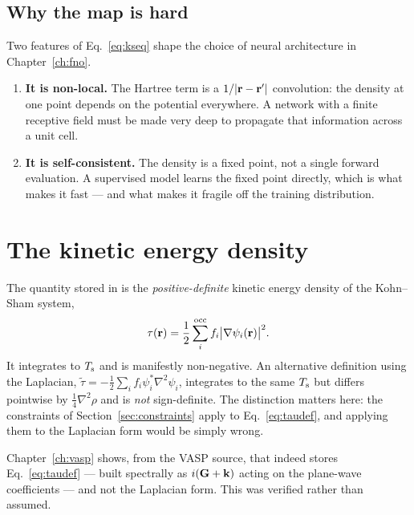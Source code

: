 \subsection{Why the map is hard}

Two features of Eq.~\eqref{eq:kseq} shape the choice of neural architecture in
Chapter~\ref{ch:fno}.

\begin{enumerate}
  \item \textbf{It is non-local.} The Hartree term is a
    $1/|\mathbf{r}-\mathbf{r}'|$ convolution: the density at one point depends on the
    potential everywhere. A network with a finite receptive field must be made
    very deep to propagate that information across a unit cell.
  \item \textbf{It is self-consistent.} The density is a fixed point, not a
    single forward evaluation. A supervised model learns the fixed point
    directly, which is what makes it fast --- and what makes it fragile off the
    training distribution.
\end{enumerate}

\section{The kinetic energy density}
\label{sec:tau}

The quantity stored in  is the \emph{positive-definite} kinetic
energy density of the Kohn--Sham system,
\begin{equation}
  \tau(\mathbf{r}) = \frac{1}{2}\sum_i^{\mathrm{occ}} f_i
              \bigl|\nabla\psi_i(\mathbf{r})\bigr|^2 .
  \label{eq:taudef}
\end{equation}
It integrates to $T_{\mathrm{s}}$ and is manifestly non-negative. An alternative
definition using the Laplacian,
$\tilde\tau = -\tfrac{1}{2}\sum_i f_i \psi_i^*\nabla^2\psi_i$, integrates to the
same $T_{\mathrm{s}}$ but differs pointwise by $\tfrac{1}{4}\nabla^2\rho$ and is
\emph{not} sign-definite. The distinction matters here: the constraints of
Section~\ref{sec:constraints} apply to Eq.~\eqref{eq:taudef}, and applying them
to the Laplacian form would be simply wrong.

\begin{ptip}
Chapter~\ref{ch:vasp} shows, from the VASP source, that  indeed
stores Eq.~\eqref{eq:taudef} --- built spectrally as $i(\mathbf{G}+\mathbf{k})$ acting on the
plane-wave coefficients --- and not the Laplacian form. This was verified
rather than assumed.
\end{ptip}

